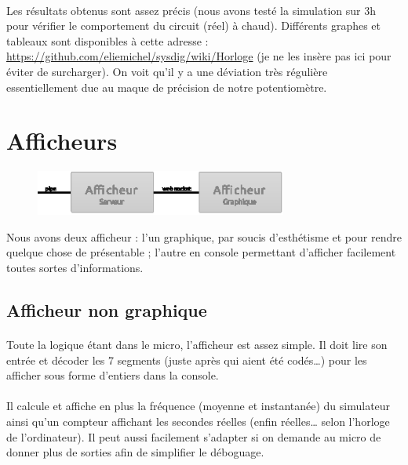 \documentclass{article}
\begin{document}
\paragraph{}Les résultats obtenus sont assez précis (nous avons testé la simulation sur 3h pour vérifier le comportement du circuit (réel) à chaud). Différents graphes et tableaux sont disponibles à cette adresse : \url{https://github.com/eliemichel/sysdig/wiki/Horloge} (je ne les insère pas ici pour éviter de surcharger). On voit qu'il y a une déviation très régulière essentiellement due au maque de précision de notre potentiomètre.


\section{Afficheurs}

\begin{figure}[h]
\centering
\includegraphics[height=4em]{zoom_output.eps}
\end{figure}
Nous avons deux afficheur : l'un graphique, par soucis d'esthétisme et pour rendre quelque chose de présentable ; l'autre en console permettant d'afficher facilement toutes sortes d'informations.

\subsection{Afficheur non graphique}
\paragraph{}Toute la logique étant dans le micro, l'afficheur est assez simple. Il doit lire son entrée et décoder les 7 segments (juste après qui aient été codés…) pour les afficher sous forme d'entiers dans la console.

\paragraph{}Il calcule et affiche en plus la fréquence (moyenne et instantanée) du simulateur ainsi qu'un compteur affichant les secondes réelles (enfin réelles… selon l'horloge de l'ordinateur). Il peut aussi facilement s'adapter si on demande au micro de donner plus de sorties afin de simplifier le déboguage.
\end{document}
